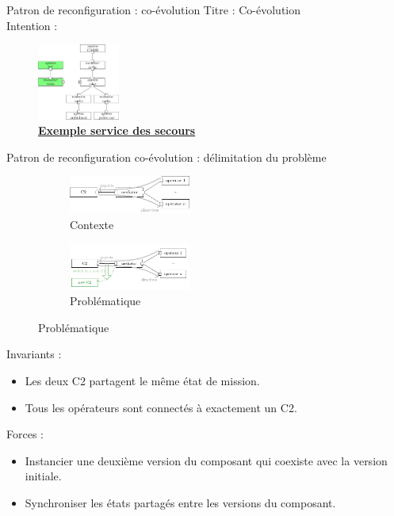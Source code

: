 \begin{frame}{Patron de reconfiguration : co-évolution}
\centering
\flushleft
Titre : Co-évolution\\
Intention : \\
\begin{figure}
\includegraphics[height=2.5cm]{imgs/fig_rearchitecture}
\caption{\underline{\textbf{Exemple service des secours}}}
\end{figure}
\end{frame}

\begin{frame}{Patron de reconfiguration co-évolution : délimitation du problème}
\begin{figure}
\begin{subfigure}[b]{0.4\textwidth}
\includegraphics[width=4cm]{imgs/dc-context}
\caption{Contexte}
\end{subfigure}
\begin{subfigure}[b]{0.4\textwidth}
\includegraphics[width=4cm]{imgs/dc_archi-C2}
\caption{Problématique}
\end{subfigure}
\end{figure}

Invariants :
\begin{itemize}
\item Les deux C2 partagent le même état de mission.
\item Tous les opérateurs sont connectés à exactement un
C2. 
\end{itemize}

Forces :
\begin{itemize}
\item Instancier une deuxième version du composant qui coexiste avec
la version initiale.
\item Synchroniser les états partagés entre les versions du
composant.
\end{itemize}

\end{frame}

